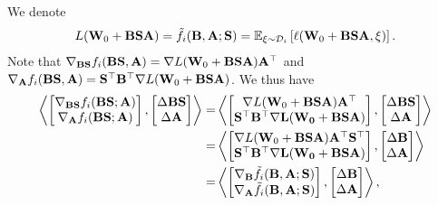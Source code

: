 \documentclass{article} %
\theoremstyle{plain}
\theoremstyle{definition}
\begin{document}
We denote 
\begin{align}\label{notation_function_L}
    L({\bf W}_{0} + {\bf B}{\bf S}{\bf A}) = \tilde{f}_{i} ({\bf B}, {\bf A}; {\bf S}) = \mathbb{E}_{\xi \sim \mathcal{D}_i} \left[ \ell ({\bf W}_{0} + {\bf B} {\bf S}{\bf A}, \xi)\right].
\end{align}
Note that \(\nabla_{{\bf B}{\bf S}} f_{i} ({\bf B} {\bf S},{\bf A}) = \nabla L({\bf W}_{0} + {\bf B}\bf S{\bf A}){\bf A}^{\top}\) and \(\nabla_{\bf A} f_{i} ({\bf B} {\bf S},{\bf A}) = {\bf S}^{\top} {\bf B}^{\top}  \nabla L({\bf W}_{0} + {\bf B} {\bf S} {\bf A})\). We thus have
\begin{align}
 \left \langle \begin{bmatrix}
       \nabla_{{\bf B}{\bf S}} f_{i} ({\bf B} {\bf S}; {\bf A}) \\
       \nabla_{\bf A} f_{i} ({\bf B} {\bf S}; {\bf A}) 
    \end{bmatrix}, 
    \begin{bmatrix}
        \Delta {\bf B} {\bf S}\\
        \Delta {\bf A}  
    \end{bmatrix}
    \right \rangle  
    =& \left \langle \begin{bmatrix}
      \nabla L({\bf W}_{0} + {\bf B}{\bf S}{\bf A}){\bf A}^{\top} \\
       {\bf S}^{\top} \bf B^{\top} \nabla L({\bf W}_{0} + {\bf B}{\bf S}{\bf A})
    \end{bmatrix}, 
    \begin{bmatrix}
        \Delta {\bf B} {\bf S}\\
         \Delta {\bf A} 
    \end{bmatrix}
    \right \rangle  \nonumber\\
    =&  \left \langle \begin{bmatrix}
      \nabla L({\bf W}_{0} + {\bf B}\bf S{\bf A}){\bf A}^{\top} {\bf S}^{\top} \\
       {\bf S}^{\top} \bf B^{\top} \nabla L({\bf W}_{0} + {\bf B}\bf S{\bf A})
    \end{bmatrix}, 
    \begin{bmatrix}
        \Delta {\bf B} \\
         \Delta {\bf A} 
    \end{bmatrix}
    \right \rangle  \nonumber\\
    =&  \left \langle \begin{bmatrix}
      \nabla_{\bf B} \tilde{f}_i({\bf B},{\bf A}; {\bf S}) \\
        \nabla_{\bf A} \tilde{f}_i({\bf B}, {\bf A}; {\bf S})
    \end{bmatrix}, 
    \begin{bmatrix}
        {\Delta {\bf B}} \\
        {\Delta {\bf A}} 
    \end{bmatrix}
    \right \rangle,  \label{gradient_transformation}
\end{align}
\end{document}
